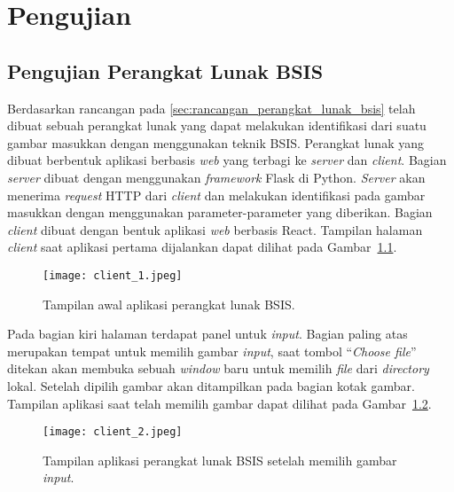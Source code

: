\chapter{Pengujian}

\section{Pengujian Perangkat Lunak BSIS}
Berdasarkan rancangan pada \ref{sec:rancangan_perangkat_lunak_bsis} telah dibuat sebuah perangkat lunak yang dapat melakukan identifikasi dari suatu gambar masukkan dengan menggunakan teknik BSIS. Perangkat lunak yang dibuat berbentuk aplikasi berbasis \textit{web} yang terbagi ke \textit{server} dan \textit{client}. Bagian \textit{server} dibuat dengan menggunakan \textit{framework} Flask di Python. \textit{Server} akan menerima \textit{request} HTTP dari \textit{client} dan melakukan identifikasi pada gambar masukkan dengan menggunakan parameter-parameter yang diberikan. Bagian \textit{client} dibuat dengan bentuk aplikasi \textit{web} berbasis React. Tampilan halaman \textit{client} saat aplikasi pertama dijalankan dapat dilihat pada Gambar~\ref{fig:client_1}.
\begin{figure}[H]
	\centering
	\texttt{[image: client\_1.jpeg]}
	\caption{Tampilan awal aplikasi perangkat lunak BSIS.}
	\label{fig:client_1}
\end{figure}

Pada bagian kiri halaman terdapat panel untuk \textit{input}. Bagian paling atas merupakan tempat untuk memilih gambar \textit{input}, saat tombol ``\textit{Choose file}'' ditekan akan membuka sebuah \textit{window} baru untuk memilih \textit{file} dari \textit{directory} lokal. Setelah dipilih gambar akan ditampilkan pada bagian kotak gambar. Tampilan aplikasi saat telah memilih gambar dapat dilihat pada Gambar~\ref{fig:client_2}. 
\begin{figure}[H]
	\centering
	\texttt{[image: client\_2.jpeg]}
	\caption{Tampilan aplikasi perangkat lunak BSIS setelah memilih gambar \textit{input}.}
	\label{fig:client_2}
\end{figure}

